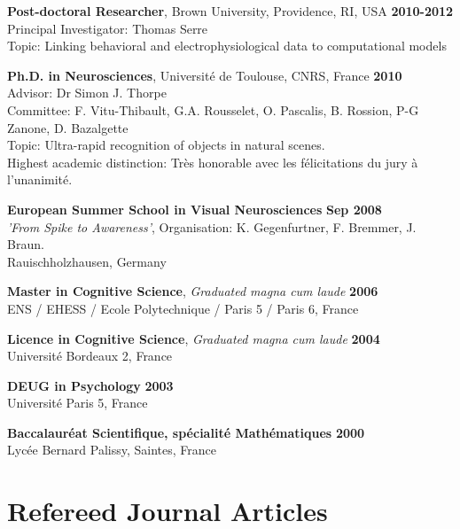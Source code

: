\documentclass[margin,line]{resume}
\begin{document}
\begin{resume}
	\textbf{Post-doctoral Researcher}, Brown University, Providence, RI, USA \hfill \textbf{2010-2012}\\
	Principal Investigator: Thomas Serre\\
	Topic: Linking behavioral and electrophysiological data to computational models
	\vspace{-1.5mm}
	
    \textbf{Ph.D. in Neurosciences}, Université de Toulouse, CNRS, France \hfill \textbf{2010}\\
	Advisor:  Dr Simon J. Thorpe\\
	Committee: F. Vitu-Thibault, G.A. Rousselet, O. Pascalis, B. Rossion, P-G Zanone, D. Bazalgette\\
	Topic: Ultra-rapid recognition of objects in natural scenes.\\
	Highest academic distinction: Très honorable avec les félicitations du jury à l'unanimité.
	\vspace{-1.5mm}

	\textbf{European Summer School in Visual Neurosciences} \hfill \textbf{Sep 2008}\\
	\textsl{'From Spike to Awareness'}, Organisation: K. Gegenfurtner, F. Bremmer, J. Braun.\\
	Rauischholzhausen, Germany
	\vspace{-1.5mm}

	\textbf{Master in Cognitive Science}, \textsl{Graduated magna cum laude} \hfill \textbf{2006}\\
	ENS / EHESS / Ecole Polytechnique / Paris 5 / Paris 6, France
	\vspace{-1.5mm}

	\textbf{Licence in Cognitive Science}, \textsl{Graduated magna cum laude} \hfill \textbf{2004}\\
	Université Bordeaux 2, France
	\vspace{-1.5mm}
	
	\textbf{DEUG in Psychology} \hfill \textbf{2003}\\
	Université Paris 5, France
	\vspace{-1.5mm}
	
	\textbf{Baccalauréat Scientifique, spécialité Mathématiques} \hfill \textbf{2000}\\
	Lycée Bernard Palissy, Saintes, France

	\vspace{3mm}	
    \section{\mysidestyle Refereed Journal Articles}
    

\end{resume}
\end{document}
